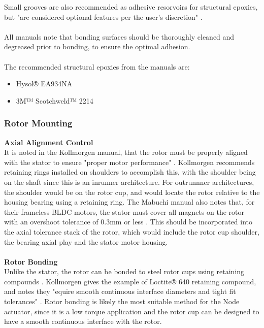 \documentclass[internal]{../../../classes/nervtech-research}
\begin{document}
Small grooves are also recommended as adhesive resorvoirs for structural epoxies, but "are considered optional features per the user's discretion" \cite{KollmorgenManual}.
\\\\
All manuals note that bonding surfaces should be thoroughly cleaned and degreased prior to bonding, to ensure the optimal adhesion.
\\\\
The recommended structural epoxies from the manuals are:
\begin{itemize}
  \item Hysol® EA934NA \cite{KollmorgenManual}
  \item 3M™ Scotchweld™ 2214 \cite{KollmorgenManual}
\end{itemize}

\subsubsection{Rotor Mounting}
\textbf{Axial Alignment Control}
\\
It is noted in the Kollmorgen manual, that the rotor must be properly aligned with the stator to ensure "proper motor performance" \cite{KollmorgenManual}.
Kollmorgen recommends retaining rings installed on shoulders to accomplish this, with the shoulder being on the shaft since this is an inrunner architecture.
For outrunnner architectures, the shoulder would be on the rotor cup, and would locate the rotor relative to the housing bearing using a retaining ring.
The Mabuchi manual also notes that, for their frameless BLDC motors, the stator must cover all magnets on the rotor with an overshoot tolerance of 0.3mm or less \cite{MabuchiManual}.
This should be incorporated into the axial tolerance stack of the rotor, which would include the rotor cup shoulder, the bearing axial play and the stator motor housing.
\\\\
\textbf{Rotor Bonding}
\\
Unlike the stator, the rotor can be bonded to steel rotor cups using retaining compounds \cite{MacconManual} \cite{KollmorgenManual}.
Kollmorgen gives the example of Loctite® 640 retaining compound, and notes they "equire smooth continuous interface diameters and tight fit tolerances" \cite{KollmorgenManual}.
Rotor bonding is likely the most suitable method for the Node actuator, since it is a low torque application and the rotor cup can be designed to have a smooth continuous interface with the rotor.
\end{document}
